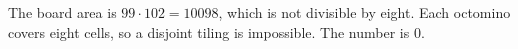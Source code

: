 The board area is $99\cdot102=10098$, which is not divisible by eight. Each octomino covers eight cells, so a disjoint tiling is impossible. The number is $\boxed0$.
